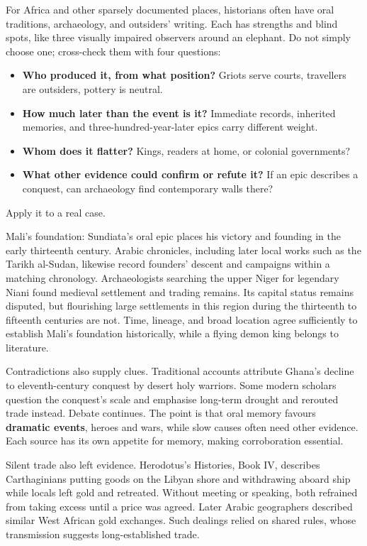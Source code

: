 For Africa and other sparsely documented places, historians often have oral traditions, archaeology, and outsiders' writing. Each has strengths and blind spots, like three visually impaired observers around an elephant. Do not simply choose one; cross-check them with four questions:

\begin{itemize}
\item \textbf{Who produced it, from what position?} Griots serve courts, travellers are outsiders, pottery is neutral.
\item \textbf{How much later than the event is it?} Immediate records, inherited memories, and three-hundred-year-later epics carry different weight.
\item \textbf{Whom does it flatter?} Kings, readers at home, or colonial governments?
\item \textbf{What other evidence could confirm or refute it?} If an epic describes a conquest, can archaeology find contemporary walls there?
\end{itemize}
Apply it to a real case.

Mali's foundation: Sundiata's oral epic places his victory and founding in the early thirteenth century. Arabic chronicles, including later local works such as the Tarikh al-Sudan, likewise record founders' descent and campaigns within a matching chronology. Archaeologists searching the upper Niger for legendary Niani found medieval settlement and trading remains. Its capital status remains disputed, but flourishing large settlements in this region during the thirteenth to fifteenth centuries are not. Time, lineage, and broad location agree sufficiently to establish Mali's foundation historically, while a flying demon king belongs to literature.

Contradictions also supply clues. Traditional accounts attribute Ghana's decline to eleventh-century conquest by desert holy warriors. Some modern scholars question the conquest's scale and emphasise long-term drought and rerouted trade instead. Debate continues. The point is that oral memory favours \textbf{dramatic events}, heroes and wars, while slow causes often need other evidence. Each source has its own appetite for memory, making corroboration essential.

Silent trade also left evidence. Herodotus's Histories, Book IV, describes Carthaginians putting goods on the Libyan shore and withdrawing aboard ship while locals left gold and retreated. Without meeting or speaking, both refrained from taking excess until a price was agreed. Later Arabic geographers described similar West African gold exchanges. Such dealings relied on shared rules, whose transmission suggests long-established trade.

